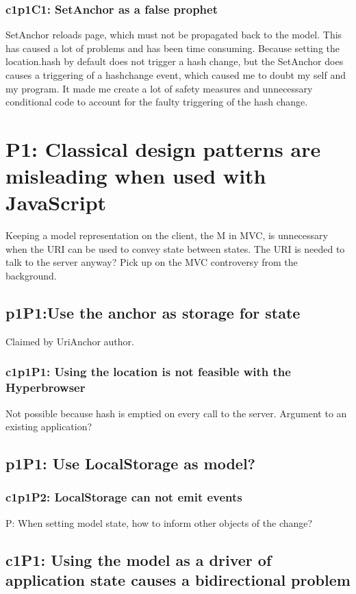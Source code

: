 \documentclass[english]{ifimaster}
\begin{document}
\subsubsection{c1p1C1: SetAnchor as a false prophet} SetAnchor reloads page, which must not be propagated back to the model. This has caused a lot of problems and has been time consuming. Because setting the location.hash by default does not trigger a hash change, but the SetAnchor does causes a triggering of a hashchange event, which caused me to doubt my self and my program. It made me create a lot of safety measures and unnecessary conditional code to account for the faulty triggering of the hash change.
\section{P1: Classical design patterns are misleading when used with JavaScript}
Keeping a model representation on the client, the M in MVC, is unnecessary when the URI can be used to convey state between states. The URI is needed to talk to the server anyway?  Pick up on the MVC controversy from the background.
\subsection{p1P1:Use the anchor as storage for state}
Claimed by UriAnchor author.

\subsubsection{c1p1P1: Using the location is not feasible with the Hyperbrowser}
Not possible because hash is emptied on every call to the server. Argument to an existing application?
\subsection{p1P1: Use LocalStorage as model?}

\subsubsection{c1p1P2: LocalStorage can not emit events}
P: When setting model state, how to inform other objects of the change?

\subsection{c1P1: Using the model as a driver of application state causes a bidirectional problem}
\end{document}
